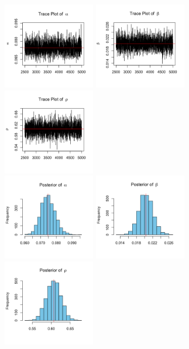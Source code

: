 \documentclass[11pt]{article}\usepackage[]{graphicx}\usepackage[]{color}
\newcommand{\bfig}{\begin{figure}}
\newcommand{\efig}{\end{figure}}
\begin{document}
{\bfig\centering
\includegraphics[width=4cm]{figures/gamma0505/a_trace.png}
\includegraphics[width=4cm]{figures/gamma0505/b_trace.png}
\includegraphics[width=4cm]{figures/gamma0505/p_trace.png}\\
\includegraphics[width=4cm]{figures/gamma0505/a_hist.png}
\includegraphics[width=4cm]{figures/gamma0505/b_hist.png}
\includegraphics[width=4cm]{figures/gamma0505/p_hist.png}
\caption{}
\label{Post1}
\efig

}
\end{document}
